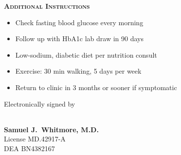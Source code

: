 \documentclass[12pt,letterpaper]{article}
\newcommand{\rxsection}[1]{%
  \vspace{2pt}%
  {\footnotesize\color{rxaccent}\textbf{\textsc{#1}}}\\[3pt]%
}
\begin{document}
\begin{minipage}[t]{0.58\linewidth}
\begin{tcolorbox}[colback=rxlight!20,colframe=rxblue,sharp corners,boxrule=1.2pt,left=14pt,right=14pt,top=12pt,bottom=12pt]
  \rxsection{Additional Instructions}
  \begin{itemize}[leftmargin=*,nosep,itemsep=3pt]
    \item[\color{rxaccent}\faCheckSquare] Check fasting blood glucose every morning
    \item[\color{rxaccent}\faCheckSquare] Follow up with HbA1c lab draw in 90 days
    \item[\color{rxaccent}\faCheckSquare] Low-sodium, diabetic diet per nutrition consult
    \item[\color{rxaccent}\faCheckSquare] Exercise: 30 min walking, 5 days per week
    \item[\color{rxaccent}\faCheckSquare] Return to clinic in 3 months or sooner if symptomatic
  \end{itemize}
\end{tcolorbox}
\end{minipage}
\hfill
\begin{minipage}[t]{0.38\linewidth}
\begin{tcolorbox}[colback=white,colframe=rxblue,sharp corners,boxrule=1.2pt,left=14pt,right=14pt,top=12pt,bottom=12pt]
  \centering
  \vspace{6pt}
  {\small\color{rxgray}Electronically signed by}\\[4pt]
  \\[2pt]
  {\small\color{rxblue}\textbf{Samuel J.\ Whitmore, M.D.}}\\[2pt]
  {\footnotesize\color{rxgray}License MD.42917-A}\\[2pt]
  {\footnotesize\color{rxgray}DEA BN4382167}\\[6pt]
  \vspace{6pt}
\end{tcolorbox}
\end{minipage}
\end{document}
